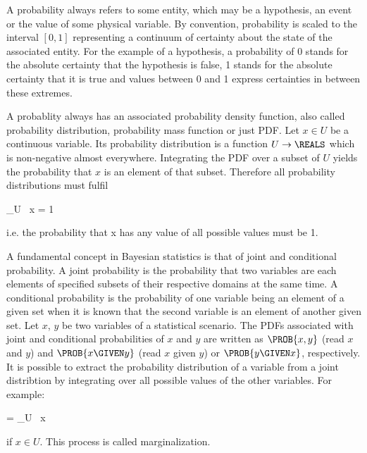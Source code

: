 \startsection[title={Bayesian Statistics}]

    A probability always refers to some entity, which may be a hypothesis, an
    event or the value of some physical variable. By convention, probability is
    scaled to the interval $[0, 1]$ representing a continuum of certainty about
    the state of the associated entity. For the example of a hypothesis,
    a probability of 0 stands for the absolute certainty that the hypothesis is
    false, 1 stands for the absolute certainty that it is true and values
    between 0 and 1 express certainties in between these extremes.

    A probablity always has an associated probability density function, also
    called probability distribution, probability mass function or just PDF.
    Let $x \in U$ be a continuous variable. Its probability distribution is
    a function $U \rightarrow \REALS$ which is non-negative almost everywhere.
    Integrating the PDF over a subset of $U$ yields the probability that
    $x$ is an element of that subset. Therefore all probability distributions
    must fulfil

    \placeformula[eq:probaint]
    \startformula
        \int_U  \, \diff x = 1 \EQCOMMA
    \stopformula
    
    i.e. the probability that x has any value of all possible values must
    be 1.

    A fundamental concept in Bayesian statistics is that of joint and
    conditional probability. A joint probability is the probability that two
    variables are each elements of specified subsets of their respective
    domains at the same time. A conditional probability is the probability of
    one variable being an element of a given set when it is known that the
    second variable is an element of another given set. Let $x$, $y$ be two
    variables of a statistical scenario. The PDFs associated with joint and
    conditional probabilities of $x$ and $y$ are written as $\PROB{x, y}$ (read
    $x$ and $y$) and $\PROB{x \GIVEN y}$ (read $x$ given $y$) or $\PROB{y
    \GIVEN x}$, respectively. It is possible to extract the probability
    distribution of a variable from a joint distribtion by integrating
    over all possible values of the other variables. For example:

    \startformula
         = \int_U  \, \diff x
    \stopformula

    if $x \in U$. This process is called marginalization.

